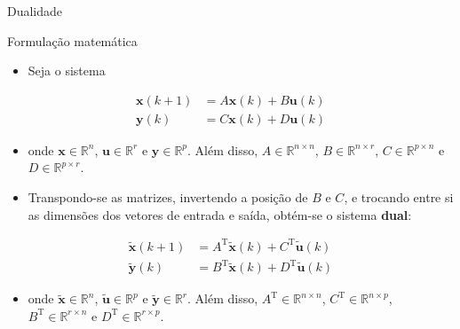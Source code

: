 \cprotect{}

\begin{frame}{Dualidade}
\begin{block}{Formulação matemática}
\begin{itemize}
    \item Seja o sistema
\end{itemize}
\begin{align*}
    \bm{x}(k+1) &= A\bm{x}(k) + B\bm{u}(k)  \\
    \bm{y}(k) &= C\bm{x}(k) + D\bm{u}(k)
\end{align*}
\vspace{-0.4cm}
	\begin{itemize}
		\item[] onde $\bm{x} \in \mathbb{R}^n$, $\bm{u} \in \mathbb{R}^r$ e $\bm{y} \in \mathbb{R}^p$. Além disso, $A \in \mathbb{R}^{n \times n}$, $B \in \mathbb{R}^{n \times r}$, $C \in \mathbb{R}^{p \times n}$ e $D \in \mathbb{R}^{p \times r}$.
		\item Transpondo-se as matrizes,  invertendo a posição de $B$ e $C$, e trocando  entre si as dimensões dos vetores de entrada e saída, obtém-se o sistema \textbf{dual}:
	\end{itemize}
\begin{align*}
    \bm{\widetilde{x}}(k+1) &= A^\text{T}\bm{\widetilde{x}}(k) + C^\text{T}\bm{\widetilde{u}}(k)  \\
    \bm{\widetilde{y}}(k) &= B^\text{T}\bm{\widetilde{x}}(k) + D^\text{T}\bm{\widetilde{u}}(k)
\end{align*}
\vspace{-0.4cm}
	\begin{itemize}
		\item[] onde $\bm{\widetilde{x}} \in \mathbb{R}^n$, $\bm{\widetilde{u}} \in \mathbb{R}^p$ e $\bm{\widetilde{y}} \in \mathbb{R}^r$. Além disso, $A^\text{T} \in \mathbb{R}^{n \times n}$, $C^\text{T} \in \mathbb{R}^{n \times p}$, $B^\text{T} \in \mathbb{R}^{r \times n}$ e $D^\text{T} \in \mathbb{R}^{r \times p}$.
	\end{itemize}
\end{block}
\end{frame}

